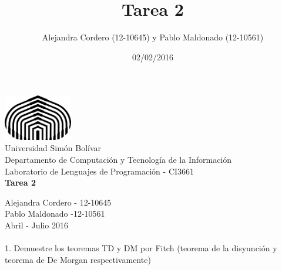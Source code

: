 \documentclass{article}
\title{Tarea 2}
\date{02/02/2016}
\author{Alejandra Cordero (12-10645) y Pablo Maldonado (12-10561)}
\begin{document}
\begin{titlepage}

\begin{center}
\includegraphics[width=3cm, height=2cm]{logo.png}\\[0.4cm]
\large{Universidad Sim\'on Bol\'ivar}\\
\large{Departamento de Computaci\'on y Tecnolog\'ia de la Informaci\'on}\\
\large{Laboratorio de Lenguajes de Programaci\'on - CI3661}\\[7cm]
\Huge\textbf{Tarea 2}\\[7cm]
\begin{raggedleft}
\large{Alejandra Cordero - 12-10645}\\
\large{Pablo Maldonado -12-10561}\\
\large Abril - Julio 2016
\end{raggedleft} 

\end{center}

\end{titlepage}


\paragraph{}

1. Demuestre los teoremas TD y DM por Fitch (teorema de la disyunci\'on y teorema de De Morgan respectivamente)
\end{document}
